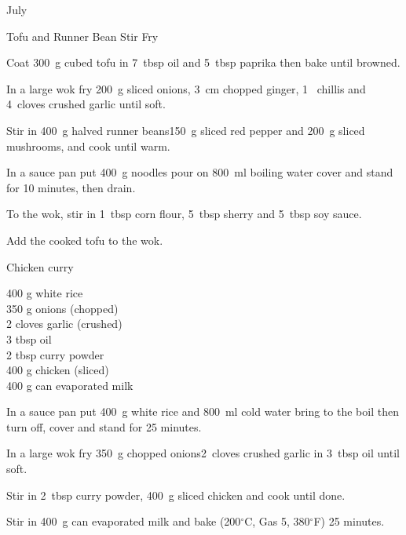 \begin{menu}{July}
\begin{recipe}{2}{Tofu and Runner Bean Stir Fry}
    \begin{instructions}
    \item 
        Coat
        300~g cubed tofu
        in
        7~tbsp  oil
        and
        5~tbsp  paprika
        then bake until browned.
      \item 
        In a large wok fry 200~g sliced onions,
        3~cm chopped ginger,
        1~  chillis
        and
        4~cloves crushed garlic
        until soft.
      \item 
        Stir in
        400~g halved runner beans150~g sliced red pepper
        and
        200~g sliced mushrooms,
        and cook until warm.
      \item 
      In a sauce pan
      put
      400~g  noodles
      pour on
      800~ml  boiling water
      cover and stand for 10 minutes, then drain.
    \item 
        To the wok, stir in
        1~tbsp  corn flour,
        5~tbsp  sherry
        and
        5~tbsp  soy sauce.
      \item 
        Add the cooked tofu to the wok.
      
    \end{instructions}
    \end{recipe}%
  
    \begin{recipe}{2}{Chicken curry}%
    
		\begin{ingredients}
		400 g white rice  \\
	350 g onions (chopped) \\
	2 cloves garlic (crushed) \\
	3 tbsp oil  \\
	2 tbsp curry powder  \\
	400 g chicken (sliced) \\
	400 g can evaporated milk  \\
	
		\end{ingredients}
	
	
    \begin{instructions}
    \item 
      In a
      sauce pan
      put
      400~g  white rice
      and
      800~ml  cold water
      bring to the boil then turn off, cover and stand for 25 minutes.
    \item 
        In a large wok fry
        350~g chopped onions2~cloves crushed garlic
        in
        3~tbsp  oil
        until soft.
      \item 
        Stir in
        2~tbsp  curry powder,
        400~g sliced chicken
        and cook until done.
      \item 
        Stir in
        400~g  can evaporated milk
        and
        bake 
      (200$^{\circ}$C, Gas 5, 380$^{\circ}$F)
     25 minutes.
      

\end{instructions}
\end{recipe}
\end{menu}
